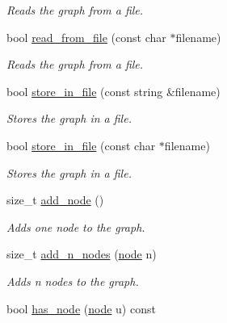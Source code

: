 \begin{DoxyCompactItemize}
\begin{DoxyCompactList}\small\item\em Reads the graph from a file. \end{DoxyCompactList}\item 
bool \hyperlink{classlgraph_1_1utils_1_1wxgraph_a74bb3ab0064749a8062c33a9213a233f}{read\+\_\+from\+\_\+file} (const char $\ast$filename)\hypertarget{classlgraph_1_1utils_1_1wxgraph_a74bb3ab0064749a8062c33a9213a233f}{}\label{classlgraph_1_1utils_1_1wxgraph_a74bb3ab0064749a8062c33a9213a233f}

\begin{DoxyCompactList}\small\item\em Reads the graph from a file. \end{DoxyCompactList}\item 
bool \hyperlink{classlgraph_1_1utils_1_1wxgraph_aff18a1cb62b8580956e8ddbb042e65e9}{store\+\_\+in\+\_\+file} (const string \&filename)\hypertarget{classlgraph_1_1utils_1_1wxgraph_aff18a1cb62b8580956e8ddbb042e65e9}{}\label{classlgraph_1_1utils_1_1wxgraph_aff18a1cb62b8580956e8ddbb042e65e9}

\begin{DoxyCompactList}\small\item\em Stores the graph in a file. \end{DoxyCompactList}\item 
bool \hyperlink{classlgraph_1_1utils_1_1wxgraph_aaa403d0b1dbca1e8e6d9cb30260e26df}{store\+\_\+in\+\_\+file} (const char $\ast$filename)\hypertarget{classlgraph_1_1utils_1_1wxgraph_aaa403d0b1dbca1e8e6d9cb30260e26df}{}\label{classlgraph_1_1utils_1_1wxgraph_aaa403d0b1dbca1e8e6d9cb30260e26df}

\begin{DoxyCompactList}\small\item\em Stores the graph in a file. \end{DoxyCompactList}\item 
size\+\_\+t \hyperlink{classlgraph_1_1utils_1_1xxgraph_af41baf2c098e872731ad646aeec1b382}{add\+\_\+node} ()
\begin{DoxyCompactList}\small\item\em Adds one node to the graph. \end{DoxyCompactList}\item 
size\+\_\+t \hyperlink{classlgraph_1_1utils_1_1xxgraph_af4f3782c1a55f73c6f34f2f2c26fb404}{add\+\_\+n\+\_\+nodes} (\hyperlink{namespacelgraph_1_1utils_a7bd66ede3805ef121bc2835bd48de0cf}{node} n)
\begin{DoxyCompactList}\small\item\em Adds {\itshape n} nodes to the graph. \end{DoxyCompactList}\item 
bool \hyperlink{classlgraph_1_1utils_1_1xxgraph_a026ab064c2be26790cc1f547be2157c9}{has\+\_\+node} (\hyperlink{namespacelgraph_1_1utils_a7bd66ede3805ef121bc2835bd48de0cf}{node} u) const \hypertarget{classlgraph_1_1utils_1_1xxgraph_a026ab064c2be26790cc1f547be2157c9}{}\label{classlgraph_1_1utils_1_1xxgraph_a026ab064c2be26790cc1f547be2157c9}


\end{DoxyCompactItemize}
